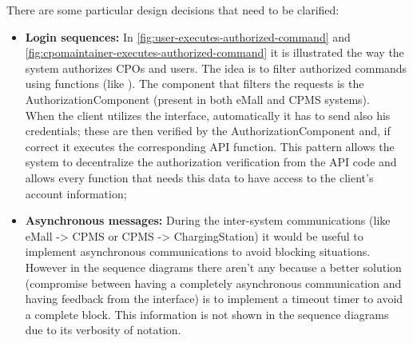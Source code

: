 \clearpage
There are some particular design decisions that need to be clarified:
\begin{itemize}
    \item \textbf{Login sequences:} In \autoref{fig:user-executes-authorized-command} and \autoref{fig:cpomaintainer-executes-authorized-command} it is illustrated the way the system authorizes \acp{CPO} and users. The idea is to filter authorized commands using functions (like \cite{ref:command-pattern}). The component that filters the requests is the AuthorizationComponent (present in both \ac{eMall} and \ac{CPMS} systems).\\
          When the client utilizes the interface, automatically it has to send also his credentials; these are then verified by the AuthorizationComponent and, if correct it executes the corresponding API function. This pattern allows the system to decentralize the authorization verification from the API code and allows every function that needs this data to have access to the client's account information;
    \item \textbf{Asynchronous messages:} During the inter-system communications (like \ac{eMall} -> \ac{CPMS} or \ac{CPMS} -> ChargingStation) it would be useful to implement asynchronous communications to avoid blocking situations. However in the sequence diagrams there aren't any because a better solution (compromise between having a completely asynchronous communication and having feedback from the interface) is to implement a timeout timer to avoid a complete block. This information is not shown in the sequence diagrams due to its verbosity of notation.

\end{itemize}
\clearpage

